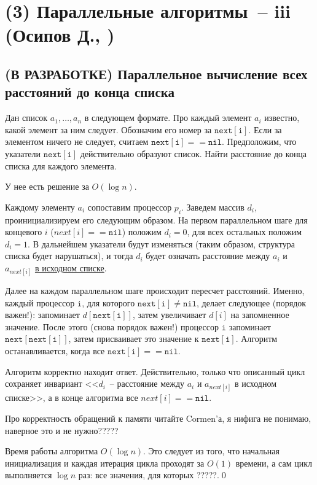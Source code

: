 \section{(3) Параллельные алгоритмы~-- iii (Осипов Д., \groth)}
\newcommand{\nxt}[1] {\mathtt{next[#1]}}
\newcommand{\nil} {\mathtt{nil}}
\subsection{(В РАЗРАБОТКЕ) Параллельное вычисление всех расстояний до конца списка}
\begin{problem*}
Дан список $a_1, \ldots, a_n$  в следующем формате. Про каждый элемент $a_i$ известно, какой элемент за ним следует. Обозначим его номер за $\nxt{i}$. Если за элементом ничего не следует, считаем $\nxt{i} == \nil$. Предположим, что указатели $\nxt{i}$ действительно образуют список. Найти расстояние до конца списка для каждого элемента.
\end{problem*}
У нее есть решение за $O(\log n)$.

Каждому элементу $a_i$ сопоставим процессор $p_i$. Заведем массив $d_i$, проинициализируем его следующим образом. На первом параллельном шаге для концевого $i$ ($next[i]==\nil$) положим $d_i = 0$, для всех остальных положим $d_i = 1$. В дальнейшем указатели будут изменяться (таким образом, структура списка будет нарушаться), и тогда $d_i$ будет означать расстояние между $a_i$ и $a_{next[i]}$ \underline{в исходном списке}.

Далее на каждом параллельном шаге происходит пересчет расстояний. Именно, каждый процессор $\mathtt i$, для которого $\nxt{i} \neq \nil$, делает следующее (порядок важен!): запоминает $d[\nxt{i}]$, затем увеличивает $d[i]$ на запомненное значение. После этого (снова порядок важен!) процессор $\mathtt i$ запоминает $\nxt{\nxt{i}}$, затем присваивает это значение к $\nxt{i}$. Алгоритм останавливается, когда все $\nxt{i} == \nil$.

Алгоритм корректно находит ответ. Действительно, только что описанный цикл сохраняет инвариант <<$d_i$~-- расстояние между $a_i$ и $a_{next[i]}$ в исходном списке>>, а в конце алгоритма все $next[i] == \nil$.

Про корректность обращений к памяти читайте Cormen'а, я нифига не понимаю, наверное это и не нужно?????

Время работы алгоритма $O(\log n)$. Это следует из того, что начальная инициализация и каждая итерация цикла проходят за $O(1)$ времени, а сам цикл выполняется $\log n$ раз: все значения, для которых ?????.\qed

